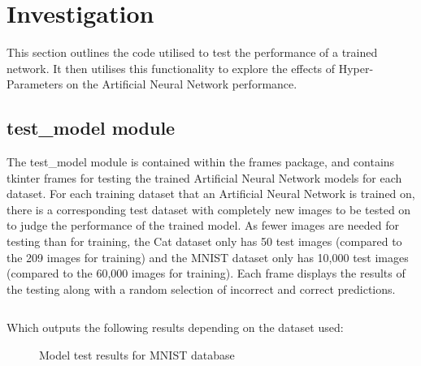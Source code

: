 \documentclass[./project-report/src/latex/project-report.tex]{subfiles}
\begin{document}
\maketitle

\clearpage

\section{Investigation}

This section outlines the code utilised to test the performance of a trained network. It then utilises this functionality to explore the effects of Hyper-Parameters on the 
Artificial Neural Network performance.

\subsection{test\_model module}
\label{sec:test_model-module}

The test\_model module is contained within the frames package, and contains tkinter frames for testing the trained Artificial Neural Network models for each dataset. 
For each training dataset that an Artificial Neural Network is trained on, there is a corresponding test dataset with completely new images to be tested on to judge 
the performance of the trained model. As fewer images are needed for testing than for training, the Cat dataset only has 50 test images (compared to the 209 images 
for training) and the MNIST \cite{wiki_mnist} dataset only has 10,000 test images (compared to the 60,000 images for training).
Each frame displays the results of the testing along with a random selection of incorrect and correct predictions.

\inputminted{python}{./school_project/frames/test_model.py}

Which outputs the following results depending on the dataset used:

\pagebreak

\begin{figure}[h!]
\centering
{}
\caption{Model test results for MNIST database}
\label{fig:test-frame-impl}
\end{figure}
\end{document}

